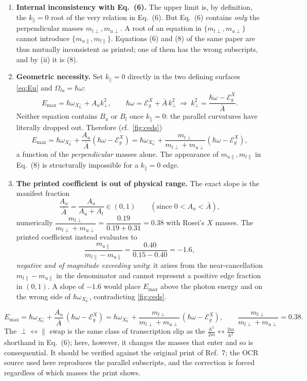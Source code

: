 \documentclass[11pt]{article}
\newcommand{\kperp}{k_{\perp}}
\newcommand{\kpar}{k_{\parallel}}
\newcommand{\hw}{\hbar\omega}
\newcommand{\EgX}{\mathcal{E}_{g}^{X}}
\newcommand{\Ab}{\bar{A}}
\newcommand{\wXsix}{\hbar\omega_{X_6^-}}
\newcommand{\Rq}[1]{\textcolor{roseicol}{\textnormal{(#1)}}}
\begin{document}
\begin{enumerate}[label=\textbf{(\roman*)}]
\item \textbf{Internal inconsistency with Eq.~\Rq{6}.}
The upper limit is, by definition, the $\kpar=0$ root of the very relation in
Eq.~\Rq{6}. But Eq.~\Rq{6} contains \emph{only} the perpendicular masses
$m_{l\perp},m_{u\perp}$. A root of an equation in $\{m_{l\perp},m_{u\perp}\}$ cannot
introduce $\{m_{u\|},m_{l\|}\}$. Equations \Rq{6} and \Rq{8} of the same paper are thus
mutually inconsistent as printed; one of them has the wrong subscripts, and by (ii) it is
\Rq{8}.

\item \textbf{Geometric necessity.}
Set $\kpar=0$ directly in the two defining surfaces \eqref{eq:Eu} and
$\Omega_{lu}=\hw$:
\[
E_{\max}=\wXsix+A_u\kperp^2,\qquad
\hw=\EgX+\Ab\,\kperp^2\ \Rightarrow\ \kperp^2=\frac{\hw-\EgX}{\Ab}.
\]
Neither equation contains $B_u$ or $B_l$ once $\kpar=0$: the parallel curvatures have
literally dropped out. Therefore (cf.\ \cref{fig:ceds})
\[
E_{\max}=\wXsix+\frac{A_u}{\Ab}(\hw-\EgX)
        =\wXsix+\frac{m_{l\perp}}{m_{l\perp}+m_{u\perp}}(\hw-\EgX),
\]
a function of the \emph{perpendicular} masses alone. The appearance of $m_{u\|},m_{l\|}$
in Eq.~\Rq{8} is structurally impossible for a $\kpar=0$ edge.

\item \textbf{The printed coefficient is out of physical range.}
The exact slope is the manifest fraction
\[
\frac{A_u}{\Ab}=\frac{A_u}{A_u+A_l}\in(0,1)\qquad(\text{since }0<A_u<\Ab),
\]
numerically $\dfrac{m_{l\perp}}{m_{l\perp}+m_{u\perp}}=\dfrac{0.19}{0.19+0.31}=0.38$ with
Rosei's $X$ masses. The printed coefficient instead evaluates to
\[
\frac{m_{u\|}}{m_{l\|}-m_{u\|}}=\frac{0.40}{0.15-0.40}=-1.6,
\]
\emph{negative and of magnitude exceeding unity}: it arises from the near-cancellation
$m_{l\|}-m_{u\|}$ in the denominator and cannot represent a positive edge fraction in
$(0,1)$. A slope of $-1.6$ would place $E_{\max}$ above the photon energy and on the wrong
side of $\wXsix$, contradicting \cref{fig:ceds}.
\end{enumerate}

\begin{keybox}[Corrected Eq.~\Rq{8}]
\[
E_{\max}=\wXsix+\frac{A_u}{\Ab}\,(\hw-\EgX)
        =\wXsix+\frac{m_{l\perp}}{m_{l\perp}+m_{u\perp}}\,(\hw-\EgX),
\qquad \frac{m_{l\perp}}{m_{l\perp}+m_{u\perp}}=0.38 .
\]
The $\perp\!\leftrightarrow\!\|$ swap is the same class of transcription slip as the
$\tfrac{\hbar^2}{2m}\!\leftrightarrow\!\tfrac{2m}{\hbar^2}$ shorthand in Eq.~\Rq{6}; here,
however, it changes the masses that enter and so is consequential. It should be verified
against the original print of Ref.~7; the OCR source used here reproduces the parallel
subscripts, and the correction is forced regardless of which masses the print shows.
\end{keybox}
\end{document}
